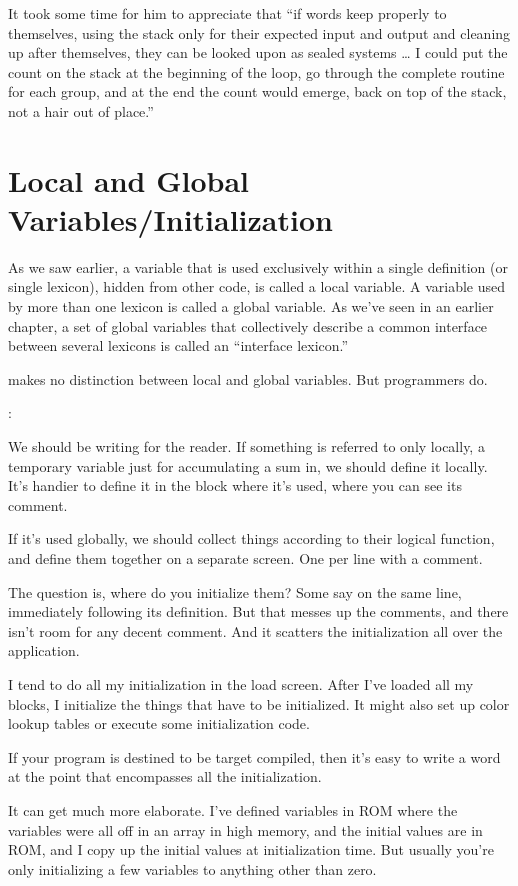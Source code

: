 It took some time for him to appreciate that ``if words keep properly
to themselves, using the stack only for their expected input and output
and cleaning up after themselves, they can be looked upon as sealed
systems \dots{} I could put the count on the stack at the beginning of the
loop, go through the complete routine for each group, and at the end the
count would emerge, back on top of the stack, not a hair out of place.''%

\section{Local and Global Variables/Initialization}%
%

As we saw earlier, a variable that is used exclusively within a single
definition (or single lexicon), hidden from other code, is called a local
variable. A variable used by more than one lexicon is called a global
variable. As we've seen in an earlier chapter, a set of global variables that
collectively describe a common interface between several lexicons is
called an ``interface lexicon.''

\Forth{} makes no distinction between local and global variables.
But \Forth{} programmers do.

\begin{interview}%
:

\begin{tfquot}
We should be writing for the reader. If something is referred to only locally,
a temporary variable just for accumulating a sum in, we should define it
locally. It's handier to define it in the block where it's used, where you can
see its comment.

If it's used globally, we should collect things according to their logical
function, and define them together on a separate screen. One per line with a
comment.

The question is, where do you initialize them? Some say on the same line,
immediately following its definition. But that messes up the comments,
and there isn't room for any decent comment. And it scatters the
initialization all over the application.

I tend to do all my initialization in the load screen. After I've loaded all my
blocks, I initialize the things that have to be initialized. It might also set
up color lookup tables or execute some initialization code.

If your program is destined to be target compiled, then it's easy to write a
word at the point that encompasses all the initialization.

It can get much more elaborate. I've defined variables in ROM where the
variables were all off in an array in high memory, and the initial values are
in ROM, and I copy up the initial values at initialization time. But usually
you're only initializing a few variables to anything other than zero.
\end{tfquot}%
\end{interview}%
%

